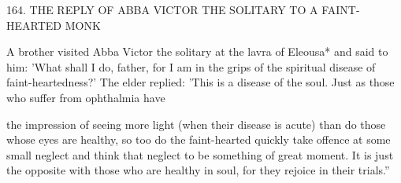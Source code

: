 164.
THE REPLY OF ABBA VICTOR THE SOLITARY
TO A FAINT-HEARTED MONK

A brother visited Abba Victor the solitary at the lavra of Eleousa*
and said to him: 'What shall I do, father, for I am in the grips of
the spiritual disease of faint-heartedness?' The elder replied: 'This is
a disease of the soul.
Just as those who suffer from ophthalmia have

the impression of seeing more light (when their disease is acute) than
do those whose eyes are healthy, so too do the faint-hearted quickly
take offence at some small neglect and think that neglect to be
something of great moment.
It is just the opposite with those who
are healthy in soul, for they rejoice in their trials.”

